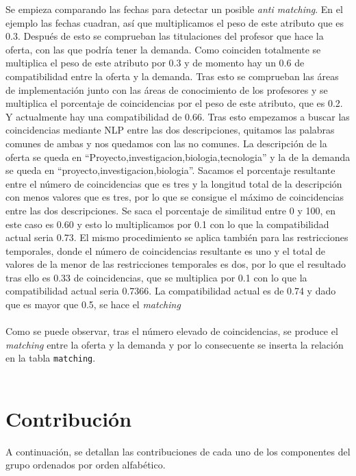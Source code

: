 \documentclass[11pt]{book}
\begin{document}
Se empieza comparando las fechas para detectar un posible \emph{anti matching}. En el ejemplo las fechas cuadran, así que multiplicamos el peso de este atributo que es 0.3. Después de esto se comprueban las titulaciones del profesor que hace la oferta, con las que podría tener la demanda. Como coinciden totalmente se multiplica el peso de este atributo por 0.3 y de momento hay un 0.6 de compatibilidad entre la oferta y la demanda. Tras esto se comprueban las áreas de implementación junto con las áreas de conocimiento de los profesores y se multiplica el porcentaje de coincidencias por el peso de este atributo, que es 0.2. Y actualmente hay una compatibilidad de 0.66. Tras esto empezamos a buscar las coincidencias mediante NLP entre las dos descripciones, quitamos las palabras comunes de ambas y nos quedamos con las no comunes. La descripción de la oferta se queda en “Proyecto,investigacion,biologia,tecnologia” y la de la demanda se queda en “proyecto,investigacion,biologia”. Sacamos el porcentaje resultante entre el número de coincidencias que es tres y la longitud total de la descripción con menos valores que es tres, por lo que se consigue el máximo de coincidencias entre las dos descripciones. Se saca el porcentaje de similitud entre 0 y 100,  en este caso es 0.60 y esto lo multiplicamos por 0.1 con lo que la compatibilidad actual seria 0.73. El mismo procedimiento se aplica también para las restricciones temporales, donde el número de coincidencias resultante es uno y el total de valores de la menor de las restricciones temporales es dos, por lo que el resultado tras ello es 0.33 de coincidencias, que se multiplica por 0.1 con lo que la compatibilidad actual seria 0.7366. La compatibilidad actual es de 0.74 y dado que es mayor que 0.5, se hace el \emph{matching}\\\\
 Como se puede observar, tras el número elevado de coincidencias, se produce el \emph{matching} entre la oferta y la demanda y por lo consecuente se inserta la relación en la tabla \texttt{matching}.\\\\

\chapter{Contribución}
A continuación, se detallan las contribuciones de cada uno de los componentes del grupo ordenados por orden alfabético.
\end{document}
